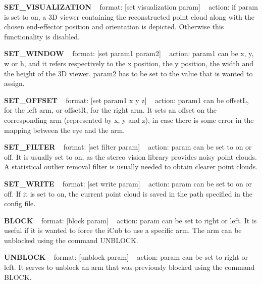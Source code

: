 {\bfseries S\+E\+T\+\_\+\+V\+I\+S\+U\+A\+L\+I\+Z\+A\+T\+I\+ON} ~\newline
format\+: \mbox{[}set visualization param\mbox{]} ~\newline
action\+: if param is set to on, a 3D viewer containing the reconstructed point cloud along with the chosen end-\/effector position and orientation is depicted. Otherwise this functionality is disabled.

{\bfseries S\+E\+T\+\_\+\+W\+I\+N\+D\+OW} ~\newline
format\+: \mbox{[}set param1 param2\mbox{]} ~\newline
action\+: param1 can be x, y, w or h, and it refers respectively to the x position, the y position, the width and the height of the 3D viewer. param2 has to be set to the value that is wanted to assign.

{\bfseries S\+E\+T\+\_\+\+O\+F\+F\+S\+ET} ~\newline
format\+: \mbox{[}set param1 x y z\mbox{]} ~\newline
action\+: param1 can be offsetL, for the left arm, or offsetR, for the right arm. It sets an offset on the corresponding arm (represented by x, y and z), in case there is some error in the mapping between the eye and the arm.

{\bfseries S\+E\+T\+\_\+\+F\+I\+L\+T\+ER} ~\newline
format\+: \mbox{[}set filter param\mbox{]} ~\newline
action\+: param can be set to on or off. It is usually set to on, as the stereo vision library provides noisy point clouds. A statistical outlier removal filter is usually needed to obtain clearer point clouds.

{\bfseries S\+E\+T\+\_\+\+W\+R\+I\+TE} ~\newline
format\+: \mbox{[}set write param\mbox{]} ~\newline
action\+: param can be set to on or off. If it is set to on, the current point cloud is saved in the path specified in the config file.

{\bfseries B\+L\+O\+CK} ~\newline
format\+: \mbox{[}block param\mbox{]} ~\newline
action\+: param can be set to right or left. It is useful if it is wanted to force the i\+Cub to use a specific arm. The arm can be unblocked using the command U\+N\+B\+L\+O\+CK.

{\bfseries U\+N\+B\+L\+O\+CK} ~\newline
format\+: \mbox{[}unblock param\mbox{]} ~\newline
action\+: param can be set to right or left. It serves to unblock an arm that was previously blocked using the command B\+L\+O\+CK.

